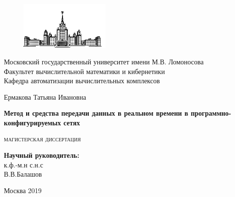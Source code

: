 \documentclass[12pt, a4paper]{article}
\begin{document}
\sloppy
	
\begin{titlepage}
\newpage
		
\begin{figure}[t]
	\centering
	\includegraphics[width=0.4\textwidth]{img/mgu}
\end{figure}
		
\begin{center}
Московский государственный университет имени М.В. Ломоносова \\
Факультет вычислительной математики и кибернетики \\
Кафедра автоматизации вычислительных комплексов \\
\end{center}
		
\vspace{4em}
\begin{center}
\large
Ермакова Татьяна Ивановна
\end{center}
	
\begin{center}
\Large
\bfseries
Метод и средства передачи данных в реальном времени в программно-конфигурируемых сетях
\end{center}

\vspace{3em}
\begin{center}
\large
\textsc{
	магистерская диссертация
}
\end{center}

\vspace{5em}
\begin{flushright}
	\textbf{Научный руководитель:}\\
	к.ф.-м.н с.н.с\\
	В.В.Балашов\\
\end{flushright}%


\vspace{\fill}
\begin{center}
Москва 2019
\end{center}
		
\end{titlepage}
\end{document}
